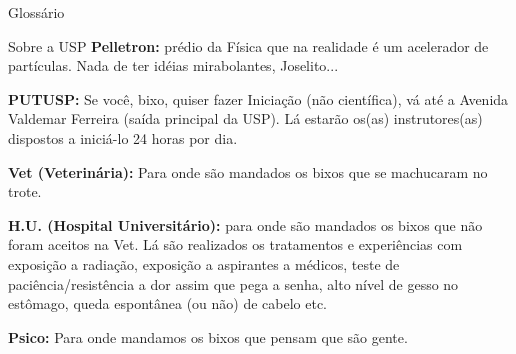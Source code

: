 \begin{secao}{Glossário}
\begin{subsecao}{Sobre a USP}
{\bf Pelletron:} prédio da Física que na realidade é um acelerador de
partículas. Nada de ter idéias mirabolantes, Joselito...

{\bf PUTUSP:} Se você, bixo, quiser fazer Iniciação (não científica), vá até a
Avenida Valdemar Ferreira (saída principal da USP). Lá estarão os(as)
instrutores(as) dispostos a iniciá-lo 24 horas por dia.

{\bf Vet (Veterinária):} Para onde são mandados os bixos que se machucaram no
trote.

{\bf H.U. (Hospital Universitário):} para onde são mandados os bixos que não
foram aceitos na Vet. Lá são realizados os tratamentos e experiências com
exposição a radiação, exposição a aspirantes a médicos, teste de
paciência/resistência a dor assim que pega a senha, alto nível de gesso no
estômago, queda espontânea (ou não) de cabelo etc.

{\bf Psico:} Para onde mandamos os bixos que pensam que são gente.

\end{subsecao}
\end{secao}
